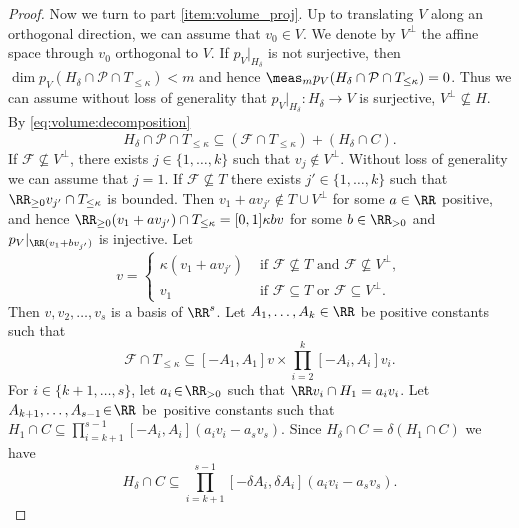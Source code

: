 \begin{proof}
Now we turn to part \eqref{item:volume_proj}. Up to translating $V$ along an orthogonal direction, we can assume that $v_0\in V$. We denote by $V^{\perp}$ the affine space through $v_0$ orthogonal to $V$.
If $p_V|_{H_\delta}$ is not surjective, then $\dim p_V(H_\delta\cap\mathcal P\cap T_{\leq\kappa})<m$ and hence \hbox{$\meas_mp_V(H_\delta\cap\mathcal P\cap T_{\leq \kappa})=0$}. Thus we can assume without loss of generality that $p_V|_{H_\delta}: H_\delta\to V$ is surjective, \ie $V^{\perp}\nsubseteq H$.
By \eqref{eq:volume:decomposition}
\[
H_\delta\cap\mathcal P\cap T_{\leq \kappa}\subseteq (\mathcal F\cap T_{\leq\kappa})+(H_\delta\cap C).
\]
If $\mathcal F\nsubseteq V^{\perp}$, there exists $j\in\{1,\dots,k\}$ such that $v_{j}\notin V^{\perp}$. Without loss of generality we can assume that $j=1$.
If $\mathcal F\nsubseteq T$ there exists $j'\in\{1,\dots,k\}$ such that \hbox{$\RR_{\geq 0}v_{j'}\cap T_{\leq \kappa}$} is bounded. Then $v_1+a v_{j'}\notin T\cup V^{\perp}$ for some $a\in\RR$ positive, and hence \hbox{$\RR_{\geq 0}(v_1+av_{j'})\cap T_{\leq \kappa}=[0,1]\kappa b v$} for some $b\in\RR_{> 0}$ and $p_V|_{\RR (v_1+bv_{j'})}$ is injective.
Let \[
v=\begin{cases}
\kappa(v_1+av_{j'}) & \text{ if } \mathcal F\nsubseteq T \text{ and } \mathcal F\nsubseteq V^{\perp}, \\
v_1 & \text{ if }\mathcal F\subseteq T \text{ or } \mathcal F\subseteq V^{\perp}.
\end{cases}
\]
Then $v, v_2,\dots,v_s$ is a basis of $\RR^s$. Let $A_1,\dots,A_k\in\RR$ be positive constants such that
\begin{equation*}\label{eq:volume:projF}
\mathcal F\cap T_{\leq\kappa}\subseteq [- A_1, A_1] v\times \prod_{i=2}^k[-A_i, A_i]v_i.
\end{equation*}
For $i\!\in\!\{k+1,\dots,s\}$, let $a_i\!\in\!\RR_{>0}$ such that $\RR v_i\cap H_1=a_iv_i$. Let $A_{k+1},\dots,A_{s-1}\!\in\!\RR$ be~positive constants such that $H_1\cap C\subseteq \prod_{i=k+1}^{s-1}[-A_i, A_i](a_iv_i-a_sv_s)$.
Since $H_{\delta}\cap C=\delta(H_1\cap C)$ we have
\[
H_{\delta}\cap C\subseteq \prod_{i=k+1}^{s-1}[-\delta A_i, \delta A_i](a_iv_i-a_sv_s).
\]


\end{proof}
